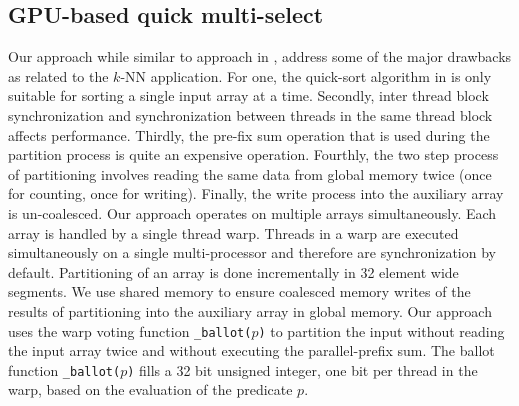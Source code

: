 \documentclass[10pt]{article}
\begin{document}
\subsection*{GPU-based quick multi-select}
Our approach while similar to approach in \cite{Cederman:2010}, address some of the major drawbacks as related to the $k$-NN application. For one, the quick-sort algorithm in \cite{Cederman:2010} is only suitable for sorting a single input array at a time. Secondly, inter thread block synchronization and synchronization between threads in the same thread block affects performance. Thirdly, the pre-fix sum operation that is used during the partition process is quite an expensive operation. Fourthly, the two step process of partitioning involves reading the same data from global memory twice (once for counting, once for writing). Finally, the write process into the auxiliary array is un-coalesced. Our approach operates on multiple arrays simultaneously. Each array is handled by a single thread warp. Threads in a warp are executed simultaneously on a single multi-processor and therefore are synchronization by default.  Partitioning of an array is done incrementally in 32 element wide segments. We use shared memory to ensure coalesced memory writes of the results of partitioning into the auxiliary array in global memory.  Our approach uses the warp voting function \texttt{\_ballot($p$)} to partition the input without reading the input array twice and without executing the parallel-prefix sum. The ballot function \texttt{\_ballot($p$)} fills a 32 bit unsigned integer, one bit per thread in the warp, based on the evaluation of the predicate $p$.\\
 
\end{document}
